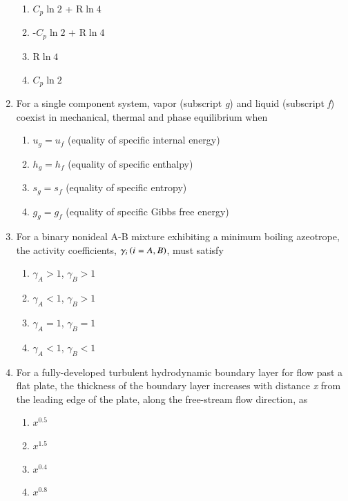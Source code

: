 \documentclass[journal]{IEEEtran}
\begin{document}
\begin{enumerate}
    \begin{enumerate}
        \item \textit{$C_p$}$\ln{2}$ + R$\ln{4}$
        \item -\textit{$C_p$}$\ln{2}$ + R$\ln{4}$
        \item R$\ln{4}$
        \item \textit{$C_p$}$\ln{2}$
    \end{enumerate}
\bigskip
    \item For a single component system, vapor (subscript \textit{g}) and liquid (subscript \textit{f}) coexist in mechanical, thermal and phase equilibrium when 
\begin{enumerate}
    \item \textit{$u_g = u_f$} (equality of specific internal energy)
    \item \textit{$h_g = h_f$} (equality of specific enthalpy)
    \item \textit{$s_g = s_f$} (equality of specific entropy)
    \item \textit{$g_g = g_f$} (equality of specific Gibbs free energy)
\end{enumerate}
\newpage
    \item  For a binary nonideal A-B mixture exhibiting a minimum boiling azeotrope, the activity coefficients, $\gamma_i\left(\textit{i} = A,B\right)$, must satisfy
\begin{enumerate}
    \item $\gamma_A > 1$, $\gamma_B > 1$
    \item $\gamma_A < 1$, $\gamma_B > 1$
    \item $\gamma_A = 1$, $\gamma_B = 1$
    \item $\gamma_A < 1$, $\gamma_B < 1$
\end{enumerate}

    \item For a fully-developed turbulent hydrodynamic boundary layer for flow past a flat plate, the thickness of the boundary layer increases with distance \textit{x} from the leading edge of the plate, along the free-stream flow direction, as
\begin{multicols}{4}
    \begin{enumerate}
        \item \textit{$x^{0.5}$}
        \item \textit{$x^{1.5}$}
        \item \textit{$x^{0.4}$}
        \item \textit{$x^{0.8}$}
    \end{enumerate}
\end{multicols}


\end{enumerate}
\end{document}
